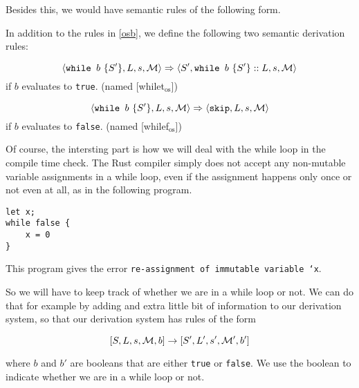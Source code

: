 Besides this, we would have semantic rules of the following form. 

\begin{definition}
\label{oswhile}
In addition to the rules in \ref{osb}, we define the following two semantic derivation rules:

$$\langle \texttt{while } b~ \{ S' \}, L, s, \mathcal{M} \rangle \Rightarrow \langle S', \texttt{while } b~ \{ S' \}::L, s, \mathcal{M} \rangle$$ 
if $b$ evaluates to \texttt{true}. (named [whilet$_{\textrm{os}}$])

$$\langle \texttt{while } b~ \{ S' \}, L, s, \mathcal{M} \rangle \Rightarrow \langle \texttt{skip}, L, s, \mathcal{M} \rangle$$ 
if $b$ evaluates to \texttt{false}. (named [whilef$_{\textrm{os}}$])
\end{definition}

Of course, the intersting part is how we will deal with the while loop in the compile time check. The Rust compiler simply does not accept any non-mutable variable assignments in a while loop, even if the assignment happens only once or not even at all, as in the following program.

\begin{verbatim}
let x;
while false {
    x = 0
}
\end{verbatim}

This program gives the error \texttt{re-assignment of immutable variable `x}.

So we will have to keep track of whether we are in a while loop or not. We can do that for example by adding and extra little bit of information to our derivation system, so that our derivation system has rules of the form 

$$[ S, L, s, \mathcal{M}, b ] \to [ S', L', s', \mathcal{M'}, b' ]$$

where $b$ and $b'$ are booleans that are either \texttt{true} or \texttt{false}. We use the boolean to indicate whether we are in a while loop or not. 

